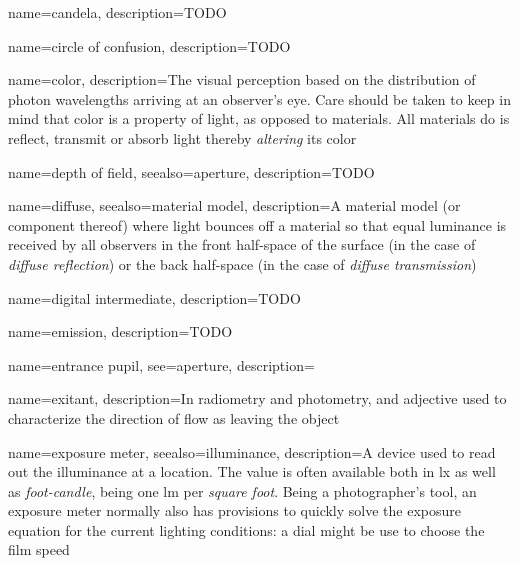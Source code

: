 {
	name={candela},
	description={TODO}
}

{
	name={circle of confusion},
	description={TODO}
}

{
	name={color},
	description={The visual perception based on the distribution of photon wavelengths arriving
		at an observer's eye. Care should be taken to keep in mind that color is a property of
		light, as opposed to materials. All materials do is reflect, transmit or absorb light
		thereby \emph{altering} its color}
}

{
	name={depth of field},
	seealso={aperture},
	description={TODO}
}

{
	name={diffuse},
	seealso={material model},
	description={A material model (or component thereof) where light bounces off a material
		so that equal luminance is received by all observers in the front half-space of the
		surface (in the case of \textsl{diffuse reflection}) or the back half-space (in the
		case of \textsl{diffuse transmission})}
}

{
	name={digital intermediate},
	description={TODO}
}

{
	name={emission},
	description={TODO}
}

{
	name={entrance pupil},
	see={aperture},
	description=\nopostdesc
}

{
	name={exitant},
	description={In radiometry and photometry, and adjective used to characterize the direction of
		flow as leaving the object}
}


{
	name={exposure meter},
	seealso={illuminance},
	description={A device used to read out the illuminance at a location. The value is often
		available both in \unit{\lux} as well as \textsl{foot-candle}, being one \unit{\lumen}
		per \textsl{square foot}. Being a photographer's tool, an exposure meter normally also
		has provisions to quickly solve the exposure equation for the current lighting
		conditions: a dial might be use to choose the film speed }
}

